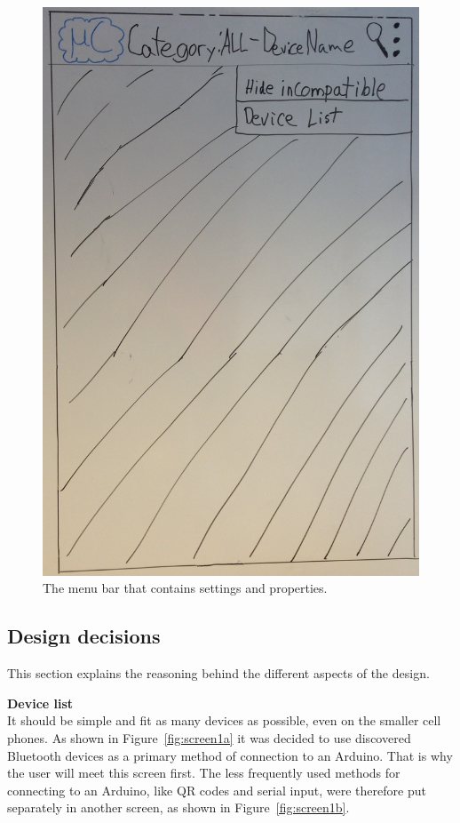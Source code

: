 \begin{figure}[H]
\centering
\includegraphics[scale=0.2]{images/Design_guide/ScreenXa.png}
\caption[Screen Xa - Action overflow]{The menu bar that contains settings and properties.}
\label{fig:screenXa}
\end{figure}

	\subsection{Design decisions}
	This section explains the reasoning behind the different aspects of the design.

	\textbf{Device list}\\
	It should be simple and fit as many devices as possible, even on the smaller cell phones. As shown in Figure~\ref{fig:screen1a} it was decided to use discovered Bluetooth devices as a primary method of connection to an Arduino. That is why the user will meet this screen first. The less frequently used methods for connecting to an Arduino, like QR codes and serial input, were therefore put separately in another screen, as shown in Figure~\ref{fig:screen1b}. \\


